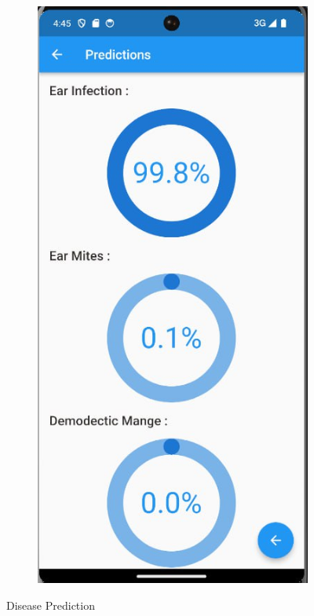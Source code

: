 \begin{figure}[ht]
\begin{subfigure}{0.43\textwidth}
  \end{subfigure}%
  \hfill
  \begin{subfigure}{0.44\textwidth}
    \includegraphics[width=\linewidth]{img/disease1.jpg}
  
  \end{subfigure}
  \caption{Disease Prediction}
\label{}
\end{figure}
\newpage

